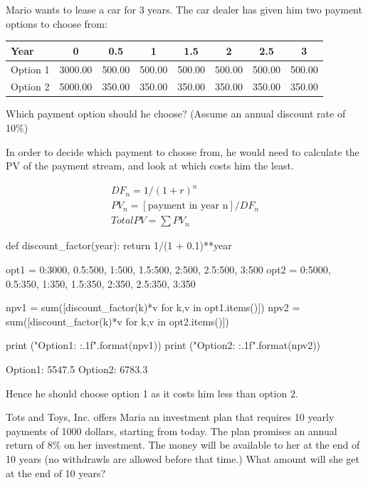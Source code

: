 \cprotEnv\begin{question}
Mario wants to lease a car for 3 years. The car dealer has given him two payment options to choose from:
	
	\begin{table}[htbp]
		\centering
		\begin{tabular}{l|c|c|c|c|c|c|c}
			Year & 0 & 0.5 & 1 & 1.5 & 2 & 2.5 & 3 \\
			\hline
			Option 1 &	3000.00	& 500.00 & 500.00 &	500.00 & 500.00 & 500.00 & 500.00 \\
			\hline
			Option 2 &	5000.00	& 350.00 & 350.00 &	350.00 & 350.00 & 350.00 & 350.00 \\
		\end{tabular}
	\end{table}
	
	Which payment option should he choose? (Assume an annual discount rate of 10\%)
\end{question}

\cprotEnv\begin{solution}
	In order to decide which payment to choose from, he would need to calculate the PV of the payment stream, and look at which costs him the least. 
	
	\begin{gather*}
		DF_n = 1/(1 + r)^n \\
		PV_n = [\textrm{payment in year n}] / DF_n \\
		Total PV = \sum PV_n
	\end{gather*}
	
	\begin{ipython}
		def discount_factor(year):
		return 1/(1 + 0.1)**year
		
		opt1 = {0:3000, 0.5:500, 1:500, 1.5:500, 2:500, 2.5:500, 3:500}
		opt2 = {0:5000, 0.5:350, 1:350, 1.5:350, 2:350, 2.5:350, 3:350}
		
		npv1 = sum([discount_factor(k)*v for k,v in opt1.items()])
		npv2 = sum([discount_factor(k)*v for k,v in opt2.items()])
		
		print ("Option1: {:.1f}".format(npv1))
		print ("Option2: {:.1f}".format(npv2))
	\end{ipython}
	\begin{ioutput}
		Option1: 5547.5
		Option2: 6783.3
	\end{ioutput}
	Hence he should choose option 1 as it costs him less than option 2.
\end{solution}

\begin{question}
	Tots and Toys, Inc. offers Maria an investment plan that requires 10 yearly payments of 1000 dollars, starting from today. The plan promises an annual return of 8\% on her investment. The money will be available to her at the end of 10 years (no withdrawls are allowed before that time.) 
	What amount will she get at the end of 10 years?
\end{question}

